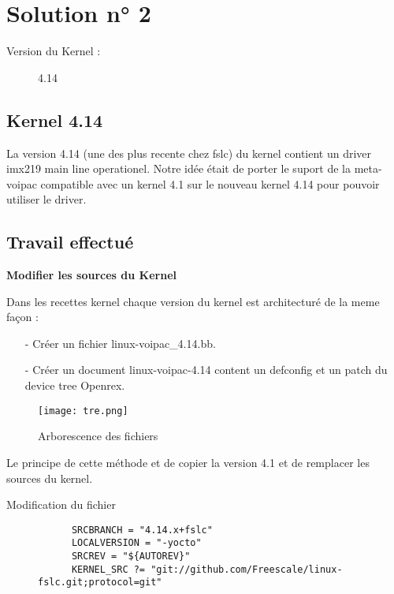 
\chapter{Solution n° 2} %

\label{Chapter3} %
\begin{description}
  \item[Version du Kernel :] 4.14
\end{description}

\section{Kernel 4.14}
La version 4.14 (une des plus recente chez fslc) du kernel contient un driver imx219
main line operationel. Notre idée était de porter le suport de la meta-voipac compatible
avec un kernel 4.1 sur le nouveau kernel 4.14 pour pouvoir utiliser le driver.

\section{Travail effectué}
\textbf{Modifier les sources du Kernel}

 Dans les recettes kernel chaque version du kernel est architecturé de la meme façon :
  \begin{itemize}
  \item[-] Créer un fichier linux-voipac\_4.14.bb.
  \item[-] Créer un document linux-voipac-4.14 content un defconfig et un patch du device tree Openrex.
  \end{itemize}

\begin{figure}[th]
  \centering
  \texttt{[image: tre.png]}
  \decoRule
  \caption{Arborescence des fichiers}  \label{fig:arborescence4.14}
\end{figure}

Le principe de cette méthode et de copier la version 4.1 et de remplacer les sources du kernel. 

\begin{description}
  \item[Modification du fichier]
    \begin{lstlisting}
      SRCBRANCH = "4.14.x+fslc"
      LOCALVERSION = "-yocto"
      SRCREV = "${AUTOREV}"
      KERNEL_SRC ?= "git://github.com/Freescale/linux-fslc.git;protocol=git"
    \end{lstlisting}
\end{description}

